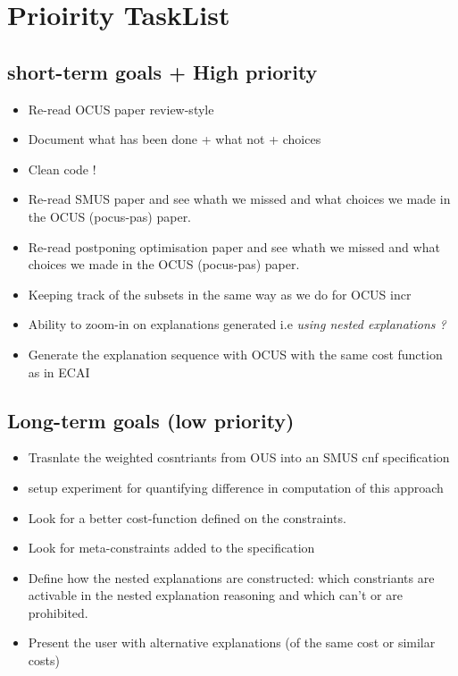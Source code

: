 \documentclass{article}
\newcommand\comment[1]{\marginpar{\tiny #1}}
\renewcommand\comment[1]{#1}
\newcommand{\todo}[1]{{\comment{\color{blue}#1}}}
\begin{document}

\section{Prioirity TaskList}
\subsection{short-term goals + High priority}
\begin{itemize}
  \item \todo{Re-read OCUS paper review-style}
  \item \todo{Document what has been done + what not + choices}
  \item \todo{Clean code !}
  \item \todo{Re-read SMUS paper and see whath we missed and what choices we made in the OCUS (pocus-pas) paper.} 
  \item \todo{Re-read postponing optimisation paper and see whath we missed and what choices we made in the OCUS (pocus-pas) paper.}
  \item \todo{Keeping track of the subsets in the same way as we do for OCUS incr}
  \item \todo{Ability to zoom-in on explanations generated i.e \textit{using nested explanations ?}}
  \item \todo{Generate the explanation sequence with OCUS with the same cost function as in ECAI}
\end{itemize}
\subsection{Long-term goals (low priority)}
\begin{itemize}
  \item \todo{Trasnlate the weighted cosntriants from OUS into an SMUS cnf specification}
  \item \todo{setup experiment for quantifying difference in computation of this approach}
  \item \todo{Look for a better cost-function defined on the constraints.}
  \item \todo{Look for meta-constraints added to the specification}
  \item \todo{Define how the nested explanations are constructed: which constriants are activable in the nested explanation reasoning and which can't or are prohibited.}
  \item \todo{Present the user with alternative explanations (of the same cost or similar costs)}
\end{itemize}
\end{document}
